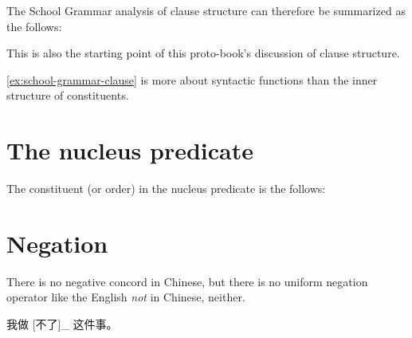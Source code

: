 \documentclass[../main.tex]{subfiles}
\begin{document}
The School Grammar analysis of clause structure can therefore be summarized as the follows:
\begin{exe}
    \ex\label{ex:school-grammar-clause} 
    
\end{exe}
This is also the starting point of this proto-book's discussion of clause structure. 

\eqref{ex:school-grammar-clause} is more about syntactic functions than the inner structure of constituents.

\section{The nucleus predicate}

The constituent (or order) in the nucleus predicate is the follows:

\section{Negation}

There is no negative concord in Chinese, but there is no uniform negation operator like the English 
\emph{not} in Chinese, neither. 

\begin{exe}
    \ex \begin{xlist}
        \ex 我做 [不了]_{} 这件事。
    \end{xlist}    
\end{exe}

\end{document}
